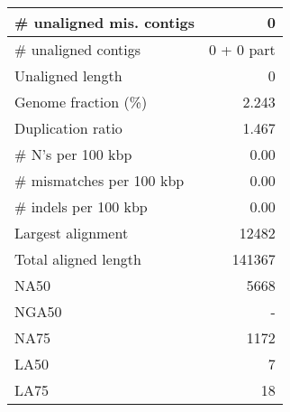 \documentclass[12pt,a4paper]{article}
\begin{document}
\begin{table}[ht]
\begin{center}
\begin{tabular}{|l*{1}{|r}|}
\# unaligned mis. contigs & 0 \\ \hline
\# unaligned contigs & 0 + 0 part \\ \hline
Unaligned length & 0 \\ \hline
Genome fraction (\%) & 2.243 \\ \hline
Duplication ratio & 1.467 \\ \hline
\# N's per 100 kbp & 0.00 \\ \hline
\# mismatches per 100 kbp & 0.00 \\ \hline
\# indels per 100 kbp & 0.00 \\ \hline
Largest alignment & 12482 \\ \hline
Total aligned length & 141367 \\ \hline
NA50 & 5668 \\ \hline
NGA50 & - \\ \hline
NA75 & 1172 \\ \hline
LA50 & 7 \\ \hline
LA75 & 18 \\ \hline
\end{tabular}
\end{center}
\end{table}
\end{document}
